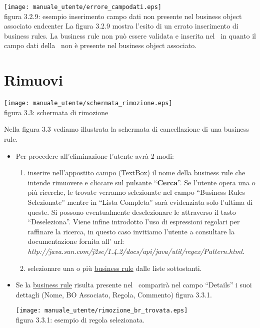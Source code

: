 \begin{center}
\texttt{[image: manuale\_utente/errore\_campodati.eps]}\\
 figura 3.2.9: esempio inserimento campo dati non presente nel business object associato
end{center} 
La figura 3.2.9 mostra l'esito di un errato inserimento di business rules. La business rule non pu\`o essere validata e inserita nel \rp\ in quanto il campo dati della \br\ non \`e presente nel business object associato.


\section{Rimuovi \br}
\begin{center}
\texttt{[image: manuale\_utente/schermata\_rimozione.eps]}\\
 figura 3.3: schermata di rimozione
\end{center}
Nella figura 3.3 vediamo illustrata la schermata di cancellazione di una business rule.
\begin{itemize}
\item Per procedere all'eliminazione l'utente avr\`a 2 modi:
\begin{enumerate}
\item inserire nell'appostito campo (TextBox) il nome della business rule che intende rimuovere e cliccare sul pulsante ``\textbf{Cerca}''. Se l'utente opera una o pi\`u ricerche, le \br  trovate verranno selezionate nel campo ``Business Rules Selezionate'' mentre in ``Lista Completa'' sar\`a evidenziata solo l'ultima di queste. Si possono eventualmente deselezionare le \br attraverso il tasto ``Deseleziona''. Viene infine introdotto l'uso di espressioni regolari per raffinare la ricerca, in questo caso invitiamo l'utente a consultare la documentazione fornita all' url:\\ \textit{http://java.sun.com/j2se/1.4.2/docs/api/java/util/regex/Pattern.html}.
\item selezionare una o pi\`u \underline{business rule} dalle liste sottostanti.
\end{enumerate}

\item Se la \underline{business rule} risulta presente nel \rp\, comparir\`a  nel campo ``Details'' i suoi dettagli (Nome, BO Associato, Regola, Commento) figura 3.3.1. 

\begin{center}
\texttt{[image: manuale\_utente/rimozione\_br\_trovata.eps]}\\
 figura 3.3.1: esempio di regola selezionata.
\end{center} 


\end{itemize}
\end{center}
